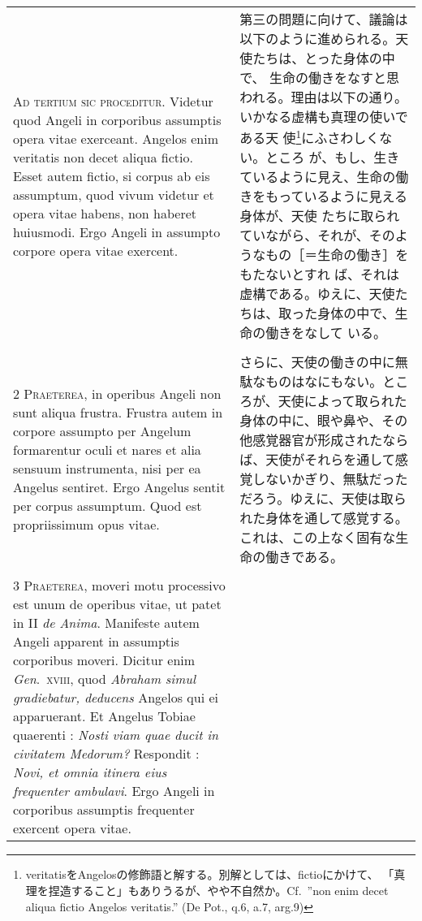 \documentclass[10pt]{jsarticle} %
\begin{document}
\begin{longtable}{p{21em}p{21em}}


{\huge A}{\scshape d tertium sic proceditur}. Videtur quod
Angeli in corporibus assumptis opera vitae exerceant. Angelos enim
veritatis non decet aliqua fictio. Esset autem fictio, si corpus ab eis
assumptum, quod vivum videtur et opera vitae habens, non haberet
huiusmodi. Ergo Angeli in assumpto corpore opera vitae exercent.

&

 第三の問題に向けて、議論は以下のように進められる。天使たちは、とった身体の中で、
 生命の働きをなすと思われる。理由は以下の通り。いかなる虚構も真理の使いである天
 使\footnote{veritatisをAngelosの修飾語と解する。別解としては、fictioにかけて、
 「真理を捏造すること」もありうるが、やや不自然か。Cf.~''non enim decet aliqua
 fictio Angelos veritatis.'' (De Pot., q.6, a.7, arg.9)}にふさわしくない。ところ
 が、もし、生きているように見え、生命の働きをもっているように見える身体が、天使
 たちに取られていながら、それが、そのようなもの［＝生命の働き］をもたないとすれ
 ば、それは虚構である。ゆえに、天使たちは、取った身体の中で、生命の働きをなして
 いる。

\\\\


{\scshape 2 Praeterea}, in operibus Angeli non sunt
aliqua frustra. Frustra autem in corpore assumpto per Angelum
formarentur oculi et nares et alia sensuum instrumenta, nisi per ea
Angelus sentiret. Ergo Angelus sentit per corpus assumptum. Quod est
propriissimum opus vitae.

&

 さらに、天使の働きの中に無駄なものはなにもない。ところが、天使によって取られた
 身体の中に、眼や鼻や、その他感覚器官が形成されたならば、天使がそれらを通して感
 覚しないかぎり、無駄だっただろう。ゆえに、天使は取られた身体を通して感覚する。
 これは、この上なく固有な生命の働きである。

\\\\

{\scshape 3 Praeterea}, moveri motu processivo est unum de operibus vitae, ut
patet in II {\itshape de Anima}. Manifeste autem Angeli apparent in assumptis
corporibus moveri. Dicitur enim {\itshape Gen}.~{\scshape xviii}, quod {\itshape
Abraham simul gradiebatur, deducens} Angelos qui ei apparuerant. Et Angelus
Tobiae quaerenti : {\itshape Nosti viam quae ducit in civitatem Medorum?}
Respondit : {\itshape Novi, et omnia itinera eius frequenter ambulavi}. Ergo
Angeli in corporibus assumptis frequenter exercent opera vitae.


\end{longtable}
\end{document}
